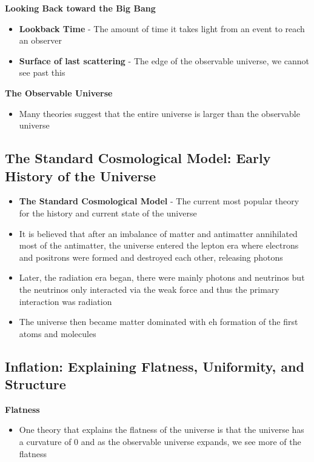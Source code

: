 \textbf{Looking Back toward the Big Bang}
\begin{itemize}
    \item \textbf{Lookback Time} - The amount of time it takes light from an event to reach an observer
    \item \textbf{Surface of last scattering} - The edge of the observable universe, we cannot see past this
\end{itemize}

\textbf{The Observable Universe}
\begin{itemize}
    \item Many theories suggest that the entire universe is larger than the observable universe
\end{itemize}

\subsection{The Standard Cosmological Model: Early History of the Universe}
\begin{itemize}
    \item \textbf{The Standard Cosmological Model} - The current most popular theory for the history and current state of the universe
    \item It is believed that after an imbalance of matter and antimatter annihilated most of the antimatter, the universe entered the lepton era where electrons and positrons were formed and destroyed each other, releasing photons
    \item Later, the radiation era began, there were mainly photons and neutrinos but the neutrinos only interacted via the weak force and thus the primary interaction was radiation
    \item The universe then became matter dominated with eh formation of the first atoms and molecules
\end{itemize}

\subsection{Inflation: Explaining Flatness, Uniformity, and Structure}
\textbf{Flatness}
\begin{itemize}
    \item One theory that explains the flatness of the universe is that the universe has a curvature of 0 and as the observable universe expands, we see more of the flatness
\end{itemize}

